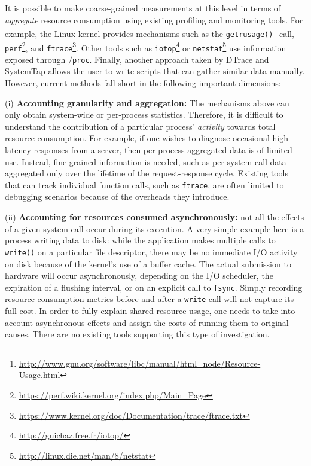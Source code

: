 \documentclass[letterpaper,twocolumn,10pt]{article}
\begin{document}
It is possible to make coarse-grained measurements at this level in terms of
\textit{aggregate} resource consumption using existing profiling and monitoring
tools. For example, the Linux kernel provides mechanisms such as the
\texttt{getrusage()}\footnote{\url{http://www.gnu.org/software/libc/manual/html_node/Resource-Usage.html}} call, \texttt{perf}\footnote{\url{https://perf.wiki.kernel.org/index.php/Main_Page}}, and \texttt{ftrace}\footnote{\url{https://www.kernel.org/doc/Documentation/trace/ftrace.txt}}. Other tools such
as \texttt{iotop}\footnote{\url{http://guichaz.free.fr/iotop/}} or \texttt{netstat}\footnote{\url{http://linux.die.net/man/8/netstat}} use information exposed through
\texttt{$/$proc}. Finally, another approach taken by DTrace \cite{dtrace} and SystemTap \cite{systap} allows the user to write scripts that can gather
similar data manually. However, current methods fall short in the following important
dimensions:

(i) \textbf{Accounting granularity and aggregation:} The mechanisms
above can only obtain system-wide or per-process statistics. Therefore, it is
difficult to understand the contribution of a particular process'
\textit{activity} towards total resource consumption. For example, if one
wishes to diagnose occasional high latency responses from a server, then
per-process aggregated data is of limited use. Instead, fine-grained information is
needed, such as per system call data aggregated only over the lifetime of the
request-response cycle. Existing tools that can track individual function calls,
such as \texttt{ftrace}, are often limited to debugging scenarios because of the overheads
they introduce.

(ii) \textbf{Accounting for resources consumed asynchronously:} not all the
effects of a given system call occur during its execution. A very simple example
here is a process writing data to disk: while the application makes multiple
calls to \texttt{write()} on a particular file descriptor, there may be no
immediate I/O activity on disk because of the kernel's use of a buffer cache.
The actual submission to hardware will occur asynchronously, depending on the
I/O scheduler, the expiration of a flushing interval, or on an explicit call to
\texttt{fsync}. Simply recording resource consumption metrics before and after a
\texttt{write} call will not capture its full cost. In order to fully explain
shared resource usage, one needs to take into account asynchronous effects and
assign the costs of running them to original causes. There are no existing tools
supporting this type of investigation.
\end{document}
